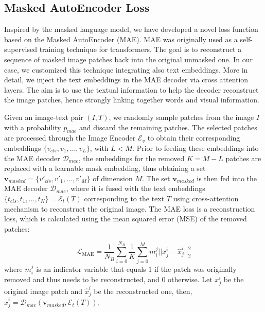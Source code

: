 \documentclass[acmsmall]{acmart}
\begin{document}
\subsection{Masked AutoEncoder Loss}
Inspired by the masked language model, we have developed a novel loss function based on the Masked AutoEncoder \cite{he2022masked} (MAE). MAE was originally used as a self-supervised training technique for transformers. The goal is to reconstruct a sequence of masked image patches back into the original unmasked one. In our case, we customized this technique integrating also text embeddings. More in detail,
we inject the text embeddings in the MAE decoder via cross attention layers. The aim is to use the textual information to help the decoder reconstruct the image patches, hence strongly linking together words and visual information.

Given an image-text pair $(I,T)$, we randomly sample patches from the image $I$ with a probability $p_{mae}$ and discard the remaining patches. The selected patches are processed through the Image Encoder $\mathcal{E}_v$ to obtain their corresponding embeddings $\{v_{cls},v_1,\dots,v_L\}$, with $L<M$. Prior to feeding these embeddings into the MAE decoder $\mathcal{D}_{mae}$, the embeddings for the removed $K=M-L$ patches are replaced with a learnable mask embedding, thus obtaining a set $\mathbf{v}_{masked}=\{v'_{cls},v'_1,\dots,v'_{M}\}$ of dimension $M$\@. The set $\mathbf{v}_{masked}$ is then fed into the MAE decoder $\mathcal{D}_{mae}$, where it is fused with the text embeddings  $\{t_{cls}, t_1,\dots,t_N\}=\mathcal{E}_t(T)$ corresponding to the text $T$ using cross-attention mechanism to reconstruct the original image. The MAE loss is a reconstruction loss, which is calculated using the mean squared error (MSE) of the removed patches:

\begin{equation}
    \mathcal{L}_\mathrm{MAE}=\frac{1}{N_B}\sum_{i=0}^{N_B}\frac{1}{K}\sum_{j=0}^{M}m_i^j||x_j^i-\hat{x}_j^i||_2^2
\end{equation}
\noindent
where \( m_i^j \) is an indicator variable that equals \( 1 \) if the patch was originally removed and thus needs to be reconstructed, and \( 0 \) otherwise. Let $x_j^i$ be the original image patch and $\hat{x}_j^i$ be the reconstructed one, then, $\hat{x}_j^i=\mathcal{D}_{mae}(\mathbf{v}_{masked},\mathcal{E}_t(T))$.
\end{document}
